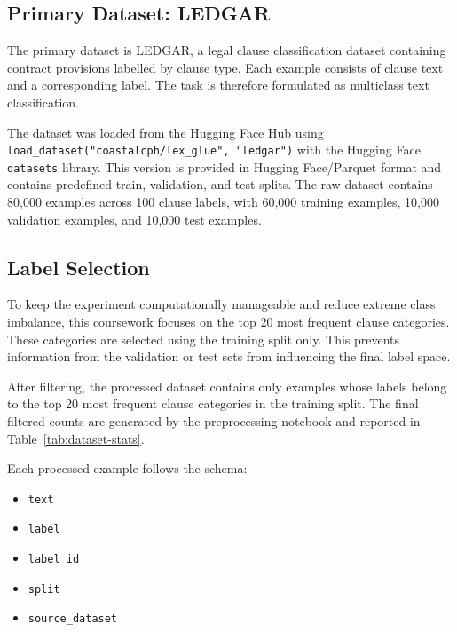 \documentclass[11pt]{article}
\begin{document}
\subsection{Primary Dataset: LEDGAR}

The primary dataset is LEDGAR, a legal clause classification dataset containing contract provisions labelled by clause type. Each example consists of clause text and a corresponding label. The task is therefore formulated as multiclass text classification.

The dataset was loaded from the Hugging Face Hub using \texttt{load\_dataset("coastalcph/lex\_glue", "ledgar")} with the Hugging Face \texttt{datasets} library. This version is provided in Hugging Face/Parquet format and contains predefined train, validation, and test splits. The raw dataset contains 80,000 examples across 100 clause labels, with 60,000 training examples, 10,000 validation examples, and 10,000 test examples.

\subsection{Label Selection}

To keep the experiment computationally manageable and reduce extreme class imbalance, this coursework focuses on the top 20 most frequent clause categories. These categories are selected using the training split only. This prevents information from the validation or test sets from influencing the final label space.

After filtering, the processed dataset contains only examples whose labels belong to the top 20 most frequent clause categories in the training split. The final filtered counts are generated by the preprocessing notebook and reported in Table~\ref{tab:dataset-stats}.

Each processed example follows the schema:

\begin{itemize}[leftmargin=*]
    \item \texttt{text}
    \item \texttt{label}
    \item \texttt{label\_id}
    \item \texttt{split}
    \item \texttt{source\_dataset}
\end{itemize}
\end{document}
